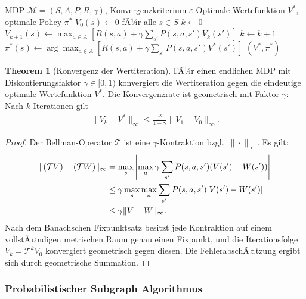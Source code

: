﻿\documentclass[a4paper,12pt]{article}
\theoremstyle{definition}
\newtheorem{theorem}{Theorem}[section]
\begin{document}
\begin{algorithm}[H]
  \caption{Wertiteration fÃ¼r MDPs}
  \begin{algorithmic}[1]
    \Eingabe MDP $\mathcal{M} = (S, A, P, R, \gamma)$, Konvergenzkriterium $\varepsilon$
    \Ausgabe Optimale Wertefunktion $V^*$, optimale Policy $\pi^*$
      \State $V_0(s) \gets 0$ fÃ¼r alle $s \in S$
      \State $k \gets 0$
      \Wiederhole
          \State $V_{k+1}(s) \gets \max_{a \in A} \left[ R(s,a) + \gamma \sum_{s'} P(s,a,s') V_k(s') \right]$
        \EndeFuer
        \State $k \gets k + 1$
      \State $\pi^*(s) \gets \arg\max_{a \in A} \left[ R(s,a) + \gamma \sum_{s'} P(s,a,s') V^*(s') \right]$
      \State \Return $(V^*, \pi^*)$
    \EndProzedur
  \end{algorithmic}
\end{algorithm}

\begin{theorem}[Konvergenz der Wertiteration]
FÃ¼r einen endlichen MDP mit Diskontierungsfaktor $\gamma \in [0,1)$ konvergiert die Wertiteration gegen die eindeutige optimale Wertefunktion $V^*$. Die Konvergenzrate ist geometrisch mit Faktor $\gamma$: Nach $k$ Iterationen gilt
\begin{align}
  \|V_k - V^*\|_\infty \leq \frac{\gamma^k}{1-\gamma} \|V_1 - V_0\|_\infty.
\end{align}
\end{theorem}

\begin{proof}
Der Bellman-Operator $\mathcal{T}$ ist eine $\gamma$-Kontraktion bzgl.\ $\|\cdot\|_\infty$. Es gilt:
\begin{align}
  \|(\mathcal{T} V) - (\mathcal{T} W)\|_\infty &= \max_s \left|\max_a \gamma \sum_{s'} P(s,a,s')(V(s') - W(s'))\right| \\
  &\leq \gamma \max_s \max_a \sum_{s'} P(s,a,s') |V(s') - W(s')| \notag \\
  &\leq \gamma \|V - W\|_\infty. \notag
\end{align}
Nach dem Banachschen Fixpunktsatz besitzt jede Kontraktion auf einem vollstÃ¤ndigen metrischen Raum genau einen Fixpunkt, und die Iterationsfolge $V_k = \mathcal{T}^k V_0$ konvergiert geometrisch gegen diesen. Die FehlerabschÃ¤tzung ergibt sich durch geometrische Summation.
\end{proof}

\subsubsection{Probabilistischer Subgraph Algorithmus}
\end{document}
